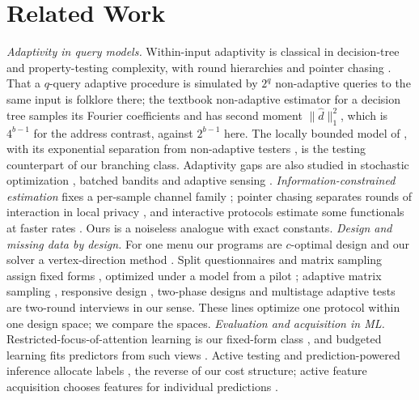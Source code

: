 \documentclass{article}
\begin{document}
\section{Related Work}\label{sec:related}
\emph{Adaptivity in query models.} Within-input adaptivity is classical in decision-tree and property-testing complexity, with round hierarchies \citep{canonne2018,li2026regex} and pointer chasing \citep{nisan1993}. That a $q$-query adaptive procedure is simulated by $2^q$ non-adaptive queries to the same input is folklore there; the textbook non-adaptive estimator for a decision tree samples its Fourier coefficients \citep{kushilevitz1993} and has second moment $\|\hat d\|_1^2$, which is $4^{b-1}$ for the address contrast, against $2^{b-1}$ here. The locally bounded model of \citet{adar2024}, with its exponential separation from non-adaptive testers \citep{goldreich2022,chakraborty2023}, is the testing counterpart of our branching class. Adaptivity gaps are also studied in stochastic optimization \citep{dean2008,golovin2011}, batched bandits \citep{perchet2016,gao2019} and adaptive sensing \citep{ariascastro2013}.
\emph{Information-constrained estimation} fixes a per-sample channel family \citep{acharya2019,barnes2020,acharya2022tit,lau2026}; pointer chasing separates rounds of interaction in local privacy \citep{joseph2019,joseph2020}, and interactive protocols estimate some functionals at faster rates \citep{butucea2023}. Ours is a noiseless analogue with exact constants.
\emph{Design and missing data by design.} For one menu our programs are $c$-optimal design and our solver a vertex-direction method \citep{fedorov1972,wynn1970,sagnol2011,stenger1979,gabler1990,aronow2026}. Split questionnaires and matrix sampling assign fixed forms \citep{raghunathan1995,graham2006,thomas2006,chipperfield2009,rhemtulla2012}, optimized under a model from a pilot \citep{adiguzel2008,jang2022}; adaptive matrix sampling \citep{gonzalez2008}, responsive design \citep{groves2006}, two-phase designs \citep{reilly1995,gilbert2014,mcisaac2015,tao2020,chen2020,chen2022} and multistage adaptive tests \citep{yamamoto2018,fink2024} are two-round interviews in our sense. These lines optimize one protocol within one design space; we compare the spaces.
\emph{Evaluation and acquisition in ML.} Restricted-focus-of-attention learning is our fixed-form class \citep{bendavid1998}, and budgeted learning fits predictors from such views \citep{cesa2011,hazan2012,lizotte2003,kapoor2005}. Active testing and prediction-powered inference allocate labels \citep{kossen2021,zrnic2024,angelopoulos2023}, the reverse of our cost structure; active feature acquisition chooses features for individual predictions \citep{trapeznikov2013,nan2017,covert2023,vonkleist2025}.
\end{document}
